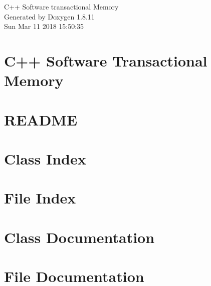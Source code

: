 \documentclass[twoside]{article}
\newcommand{\+}{\discretionary{\mbox{\scriptsize$\hookleftarrow$}}{}{}}
\newcommand{\clearemptydoublepage}{%
  \newpage{\pagestyle{empty}\cleardoublepage}%
}
\begin{document}
\hypersetup{pageanchor=false,
             bookmarksnumbered=true,
             pdfencoding=unicode
            }
\begin{titlepage}
\vspace*{7cm}
\begin{center}%
{\Large C++ Software transactional Memory }\\
\vspace*{1cm}
{\large Generated by Doxygen 1.8.11}\\
\vspace*{0.5cm}
{\small Sun Mar 11 2018 15:50:35}\\
\end{center}
\end{titlepage}
\tableofcontents
{}
\hypersetup{pageanchor=true}

\section{C++ Software Transactional Memory}
\label{index}\hypertarget{index}{}
\section{R\+E\+A\+D\+ME}
\label{md__media_zoltan_Data_00_2018_ITCarlow_00_Modules_06_Project_Documents_Git_Sync_Linux_OSTM_README}
\hypertarget{md__media_zoltan_Data_00_2018_ITCarlow_00_Modules_06_Project_Documents_Git_Sync_Linux_OSTM_README}{}

\section{Class Index}

\section{File Index}

\section{Class Documentation}



\section{File Documentation}















\newpage
{}
\clearemptydoublepage
{}
\printindex
\end{document}
